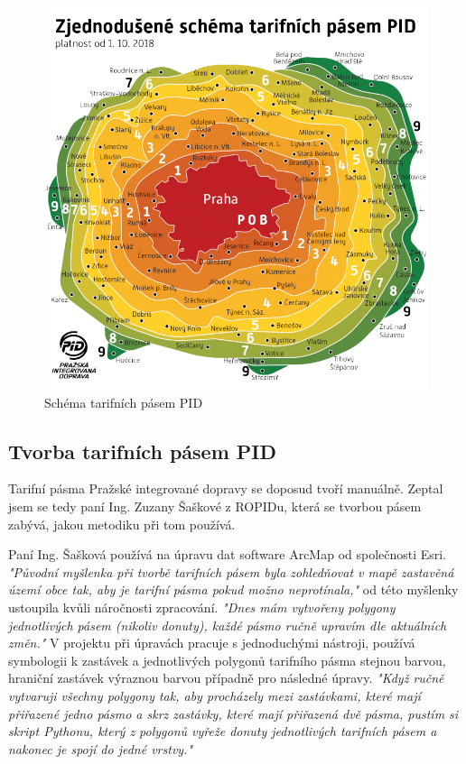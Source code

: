 \begin{figure}[H] \centering
    \includegraphics[width=400pt]{./pictures/pasma-schema.png}
    \caption[Schéma tarifních pásem PID]{Schéma tarifních pásem PID \cite{pid}}
	\label{fig:pasma-schema}                                
\end{figure}

\subsection{Tvorba tarifních pásem PID}

Tarifní pásma Pražské integrované dopravy se doposud tvoří manuálně. Zeptal jsem
se tedy paní Ing. Zuzany Šaškové z ROPIDu, která se tvorbou pásem zabývá, jakou metodiku
při tom používá. 

Paní Ing. Šašková používá na úpravu dat software ArcMap od společnosti Esri.
\textit{"Původní myšlenka při tvorbě tarifních pásem byla zohledňovat v mapě 
zastavěná území obce tak, aby je tarifní pásma pokud možno neprotínala,"} od této
myšlenky ustoupila kvůli náročnosti zpracování. \textit{"Dnes mám vytvořeny polygony 
jednotlivých pásem (nikoliv donuty), každé pásmo ručně upravím dle aktuálních změn."}
V projektu při úpravách pracuje s jednoduchými nástroji, používá symbologii k 
zastávek a jednotlivých polygonů tarifního pásma stejnou barvou, hraniční zastávek výraznou barvou 
případně pro následné úpravy. \textit{"Když ručně vytvaruji všechny polygony tak, aby procházely 
mezi zastávkami, které mají přiřazené jedno pásmo a skrz zastávky, které mají přiřazená dvě pásma,
pustím si skript Pythonu, který z polygonů vyřeže donuty jednotlivých tarifních pásem a nakonec je spojí do jedné vrstvy."}

